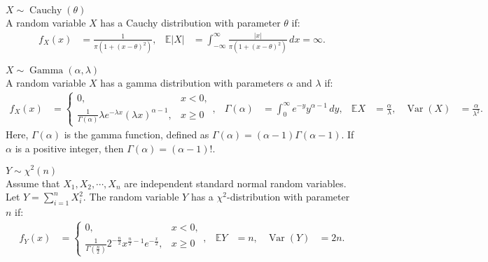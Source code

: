 \documentclass{huhtakm-template-book-v2}
\newcommand{\expect}{\mathbb{E}}
\DeclareMathOperator{\Cauchy}{Cauchy}
\DeclareMathOperator{\Gam}{Gamma}
\DeclareMathOperator{\Var}{Var}
\begin{document}
    \begin{seg} $X \sim \Cauchy(\theta)$\\
        A random variable $X$ has a Cauchy distribution with parameter $\theta$ if:
        \begin{align*}
            f_{X}(x) &= \frac{1}{\pi(1+(x-\theta)^{2})}, & \expect|X| &= \int_{-\infty}^{\infty}\frac{|x|}{\pi(1+(x-\theta)^{2})}\,dx = \infty.
        \end{align*}
    \end{seg}
    \newpage

    \begin{seg} $X \sim \Gam(\alpha,\lambda)$\\
        A random variable $X$ has a gamma distribution with parameters $\alpha$ and $\lambda$ if:
        \begin{align*}
            f_{X}(x) &= \begin{cases}
                0, &x < 0,\\
                \frac{1}{\Gamma(\alpha)}\lambda e^{-\lambda x}(\lambda x)^{\alpha-1}, &x \geq 0
            \end{cases}, & \Gamma(\alpha) &= \int_{0}^{\infty}e^{-y}y^{\alpha-1}\,dy, & \expect{X} &= \frac{\alpha}{\lambda}, & \Var(X) &= \frac{\alpha}{\lambda^{2}}.
        \end{align*}
        Here, $\Gamma(\alpha)$ is the gamma function, defined as $\Gamma(\alpha) = (\alpha-1)\Gamma(\alpha-1)$. If $\alpha$ is a positive integer, then $\Gamma(\alpha) = (\alpha-1)!$.
    \end{seg}
    \begin{seg} $Y \sim \chi^{2}(n)$\\
        Assume that $X_{1}, X_{2}, \cdots, X_{n}$ are independent standard normal random variables. Let $Y = \sum_{i = 1}^{n}X_{i}^{2}$. The random variable $Y$ has a $\chi^{2}$-distribution with parameter $n$ if:
        \begin{align*}
            f_{Y}(x) &= \begin{cases}
                0, &x < 0,\\
                \frac{1}{\Gamma\left(\frac{n}{2}\right)}2^{-\frac{n}{2}}x^{\frac{n}{2}-1}e^{-\frac{x}{2}}, &x \geq 0
            \end{cases}, & \expect{Y} &= n, & \Var(Y) &= 2n.
        \end{align*}
    \end{seg}
\end{document}
